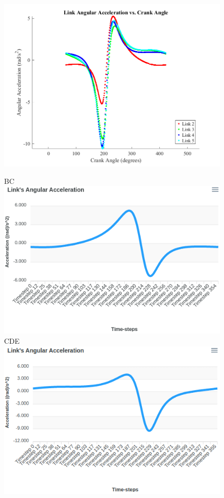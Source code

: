 \documentclass[12pt]{article}
\begin{document}
\begin{figure}[ht]
  \centering
  \includegraphics[scale=0.5]{../matlab-plots/angLinkAccel.png}

  BC \includegraphics[scale=0.4]{../pmks-plots/angLinkAcc/angLinkAccBC.png}%
  CDE \includegraphics[scale=0.4]{../pmks-plots/angLinkAcc/angLinkAccCDE.png}


\end{figure}
\end{document}
